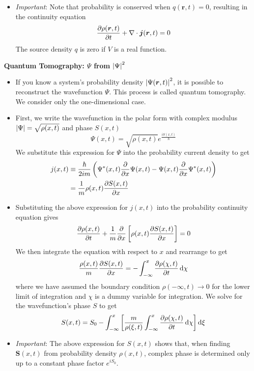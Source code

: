 \documentclass[11pt, a4paper]{article}
\newcommand{\diff}{\mathop{}\!\mathrm{d}} %
\renewcommand{\div}{\nabla \cdot}
\renewcommand{\vec}[1]{\bm{#1}}  %
\renewcommand{\r}{\vec{r}}  %
\renewcommand{\S}{\vec{S}}  %
\renewcommand{\P}{\Psi}  %
\begin{document}
\begin{itemize}
	\item \textit{Important}: Note that probability is conserved when $ q(\r, t) = 0$, resulting in the continuity equation
	\begin{equation*}
		\pdv{\rho(\r, t)}{t} + \div \vec{j}(\r, t) = 0
	\end{equation*}
	The source density $ q $ is zero if $ V $ is a real function.
	
\end{itemize}
\textbf{Quantum Tomography: $ \P $ from $ \abs{\P}^{2} $}
\begin{itemize}
	\item If you know a system's probability density $\abs{\P(\r, t)}^{2} $, it is possible to reconstruct the wavefunction $ \P $. This process is called quantum tomography. We consider only the one-dimensional case. 
	
	\item First, we write the wavefunction in the polar form with complex modulus $ \abs{\P} = \sqrt{\rho(x, t)} $ and phase $ S(x, t) $
	\begin{equation*}
		\P(x, t) = \sqrt{\rho(x, t)}e^{\frac{iS(x, t)}{\hbar}}
	\end{equation*}
	We substitute this expression for $ \P $ into the probability current density to get
	\begin{align*}
		j(x, t) &\equiv \frac{\hbar}{2im}\left(\P^{*}(x, t)\pdv{x}\P(x, t) - \P(x, t)\pdv{x}\P^{*}(x, t)\right) \\
		& = \frac{1}{m} \rho(x, t)\pdv{S(x, t)}{x}
	\end{align*}
	
	\item Substituting the above expression for $ j(x, t) $ into the probability continuity equation gives
	\begin{equation*}
		\pdv{\rho(x, t)}{t} + \frac{1}{m}\pdv{x}\left[\rho(x, t) \pdv{S(x, t)}{x}\right] = 0
	\end{equation*}
	We then integrate the equation with respect to $ x $ and rearrange to get
	\begin{equation*}
		\frac{\rho(x, t)}{m} \pdv{S(x, t)}{x} = - \int_{-\infty}^{x} \pdv{\rho(\chi, t)}{t}\diff \chi
	\end{equation*}
	where we have assumed the boundary condition $ \rho(-\infty, t) \to 0 $ for the lower limit of integration and $ \chi $ is a dummy variable for integration. We solve for the wavefunction's phase $ S $ to get
	\begin{equation*}
		S(x, t) = S_{0} - \int_{-\infty}^{x} \left[ \frac{m}{\rho(\xi, t)} \int_{-\infty}^{x} \pdv{\rho(\chi, t)}{t}\diff \chi\right] \diff \xi
	\end{equation*}
	
	\item \textit{Important}: The above expression for $ S(x, t) $ shows that, when finding $ \S(x, t) $ from probability density $ \rho(x, t) $, complex phase is determined only up to a constant phase factor $ e^{iS_{0}} $.
\end{itemize}
\end{document}
